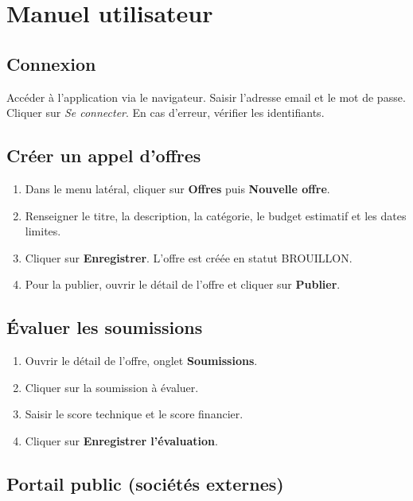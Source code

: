 
\chapter{Manuel utilisateur}

\section*{Connexion}

Accéder à l'application via le navigateur. Saisir l'adresse email et le mot de passe.
Cliquer sur \textit{Se connecter}. En cas d'erreur, vérifier les identifiants.

\section*{Créer un appel d'offres}

\begin{enumerate}
    \item Dans le menu latéral, cliquer sur \textbf{Offres} puis \textbf{Nouvelle offre}.
    \item Renseigner le titre, la description, la catégorie, le budget estimatif
    et les dates limites.
    \item Cliquer sur \textbf{Enregistrer}. L'offre est créée en statut BROUILLON.
    \item Pour la publier, ouvrir le détail de l'offre et cliquer sur \textbf{Publier}.
\end{enumerate}

\section*{Évaluer les soumissions}

\begin{enumerate}
    \item Ouvrir le détail de l'offre, onglet \textbf{Soumissions}.
    \item Cliquer sur la soumission à évaluer.
    \item Saisir le score technique et le score financier.
    \item Cliquer sur \textbf{Enregistrer l'évaluation}.
\end{enumerate}

\section*{Portail public (sociétés externes)}


